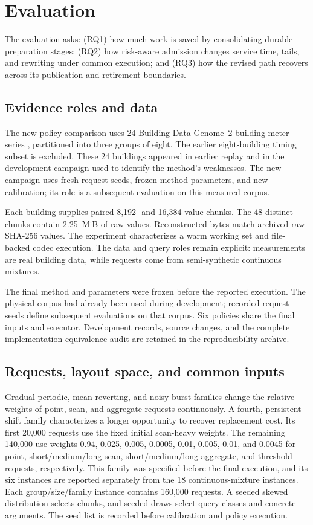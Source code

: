 \section{Evaluation}
\label{sec:evaluation}
The evaluation asks: (RQ1) how much work is saved by consolidating durable preparation stages; (RQ2) how risk-aware admission changes service time, tails, and rewriting under common execution; and (RQ3) how the revised path recovers across its publication and retirement boundaries.

\subsection{Evidence roles and data}
The new policy comparison uses 24 Building Data Genome~2 building-meter series \citep{miller2020bdg2}, partitioned into three groups of eight. The earlier eight-building timing subset is excluded. These 24 buildings appeared in earlier replay and in the development campaign used to identify the method's weaknesses. The new campaign uses fresh request seeds, frozen method parameters, and new calibration; its role is a subsequent evaluation on this measured corpus.

Each building supplies paired 8,192- and 16,384-value chunks. The 48 distinct chunks contain 2.25~MiB of raw values. Reconstructed bytes match archived raw SHA-256 values. The experiment characterizes a warm working set and file-backed codec execution. The data and query roles remain explicit: measurements are real building data, while requests come from semi-synthetic continuous mixtures.

The final method and parameters were frozen before the reported execution. The physical corpus had already been used during development; recorded request seeds define subsequent evaluations on that corpus. Six policies share the final inputs and executor. Development records, source changes, and the complete implementation-equivalence audit are retained in the reproducibility archive.

\subsection{Requests, layout space, and common inputs}
Gradual-periodic, mean-reverting, and noisy-burst families change the relative weights of point, scan, and aggregate requests continuously. A fourth, persistent-shift family characterizes a longer opportunity to recover replacement cost. Its first 20,000 requests use the fixed initial scan-heavy weights. The remaining 140,000 use weights 0.94, 0.025, 0.005, 0.0005, 0.01, 0.005, 0.01, and 0.0045 for point, short/medium/long scan, short/medium/long aggregate, and threshold requests, respectively. This family was specified before the final execution, and its six instances are reported separately from the 18 continuous-mixture instances. Each group/size/family instance contains 160,000 requests. A seeded skewed distribution selects chunks, and seeded draws select query classes and concrete arguments. The seed list is recorded before calibration and policy execution.

